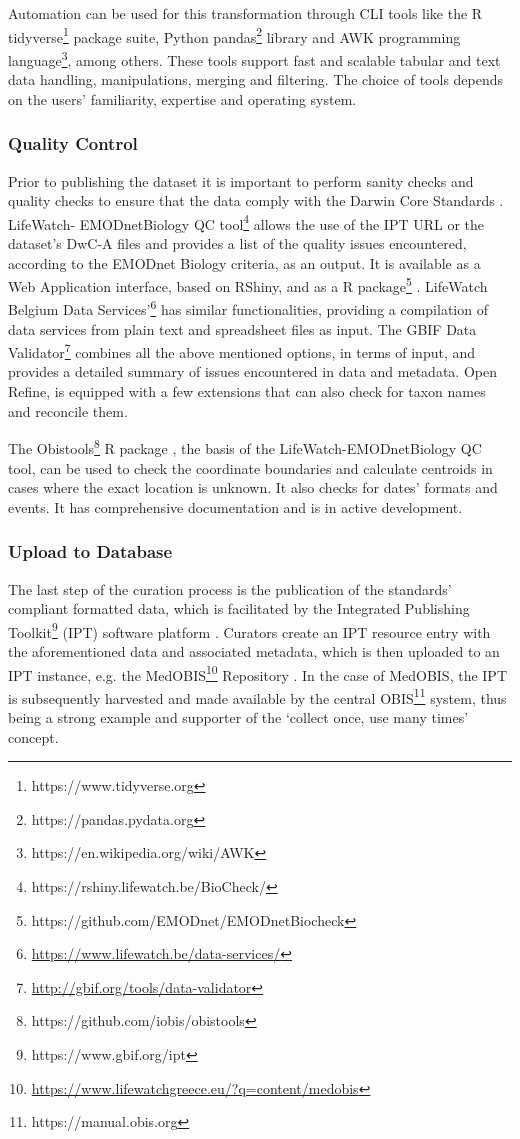 Automation can be used for this transformation through CLI tools like the R
tidyverse\footnote{https://www.tidyverse.org} package suite, Python
pandas\footnote{https://pandas.pydata.org} library and AWK programming
language\footnote{https://en.wikipedia.org/wiki/AWK}, among others. These tools
support fast and scalable tabular and text data handling, manipulations,
merging and filtering. The choice of tools depends on the users’ familiarity,
expertise and operating system.

   \subsubsection{Quality Control}
Prior to publishing the dataset it is important to perform sanity checks and
quality checks to ensure that the data comply with the Darwin Core
Standards \citep{vandepitte_fishing_2015}. LifeWatch- EMODnetBiology QC
tool\footnote{https://rshiny.lifewatch.be/BioCheck/} allows the use of the IPT
URL or the dataset’s DwC-A files and provides a list of the quality issues
encountered, according to the EMODnet Biology criteria, as an output. It is
available as a Web Application interface, based on RShiny, and as a R
package\footnote{https://github.com/EMODnet/EMODnetBiocheck} \citep{de_pooter_emodnetbiocheck_2019}.
LifeWatch Belgium Data Services’\footnote{\url{https://www.lifewatch.be/data-services/}}
has similar functionalities, providing a compilation of data services from
plain text and spreadsheet files as input. The GBIF Data
Validator\footnote{\url{http://gbif.org/tools/data-validator}} combines all the
above mentioned options, in terms of input, and provides a detailed summary of
issues encountered in data and metadata. Open Refine, is equipped with a few
extensions that can also check for taxon names and reconcile them.

The Obistools\footnote{https://github.com/iobis/obistools} R package \citep{provoost_iobisobistools_2019},
the basis of the LifeWatch-EMODnetBiology QC tool, can be used to check the
coordinate boundaries and calculate centroids in cases where the exact location
is unknown. It also checks for dates’ formats and events. It has comprehensive
documentation and is in active development.

   \subsubsection{Upload to Database}
The last step of the curation process is the publication of the standards’
compliant formatted data, which is facilitated by the Integrated Publishing
Toolkit\footnote{https://www.gbif.org/ipt} (IPT) software platform \citep{robertson_gbif_2014}.
Curators create an IPT resource entry with the aforementioned data and
associated metadata, which is then uploaded to an IPT instance, e.g. the
MedOBIS\footnote{\url{https://www.lifewatchgreece.eu/?q=content/medobis}}
Repository \citep{arvanitidis_medobis_2006}. In the case of MedOBIS, the IPT is
subsequently harvested and made available by the central OBIS\footnote{https://manual.obis.org}
system, thus being a strong example and supporter of the ‘collect once, use
many times’ concept.

